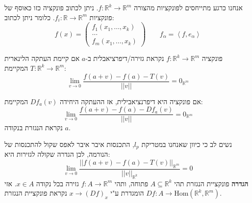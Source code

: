 \documentclass{tstextbook}
\begin{document}
אנחנו כרגע מתייחסים לפונקציות מהצורה \(f:\mathbb{R}^k\to\mathbb{R}^m\). ניתן לכתוב פונקציה כזו כאוסף של פונקציות \(f_{i}:\mathbb{R}\to\mathbb{R}^m\). כלומר ניתן לכתוב:
$$f(x)=\begin{pmatrix}{{f_{1}\left(x_{1},\ldots,x_{k}\right)}}\\ {{\ldots}}\\ {{f_{m}\!\left(x_{1},\ldots,x_{k}\right)}}
\end{pmatrix} \qquad  f_{\alpha}=\left\langle f,e_{\alpha}\right\rangle$$

\begin{definition}[דיפרנציאבליות]
פונקציה \(f:\mathbb{R}^k\to\mathbb{R}^m\) נקראת גזירה/דיפרציאבלית ב-\(a\) אם קיימת העתקה הלינארית \(T:\mathbb{R}^k\to\mathbb{R}^m\) המקיימת:
$$\operatorname*{lim}_{v\to0}{\frac{f(a+v)-f(a)-T(v)}{||v||}}=0_{\mathbb{R}^m}$$

\end{definition}
\begin{definition}
אם פונקציה היא דיפרנציאבילית, אז ההעתקה היחידה \(Df_{a}(v)\) המקיימת:
$$\operatorname*{lim}_{v\to0}{\frac{f(a+v)-f(a)-Df_{a}(v)}{||v||}}=0_{\mathbb{R}^m}$$
נקראת הנגזרת בנקודה \(a\). 

\end{definition}
נשים לב כי כיוון שאנחנו במטריקת \(l_{p}\), התכנסות איבר איבר לאפס שקול להתכנסות של הנורמה, לכן הגדרה שקולה לגזירות היא:
$$\lim_{ v \to 0 } \frac{||f(a+v)-f(a)-T(v)||_{\mathbb{R}^m}}{||v||_{\mathbb{R}^k}}=0$$\textbf{הגדרה} פונקציית הנגזרת
תהי \(A\subseteq \mathbb{R}^k\) פתוחה, ותהי \(f:A\to\mathbb{R}^m\) גזירה בכל נקודה \(x \in A\). אזי \(Df:A\to \mathrm{Hom}\left( \mathbb{R}^k,\mathbb{R}^m \right)\) הומגדרת ע"י \(x\to (Df)_{x}\) נקראת פונקציית הנגזרת.
\end{document}
